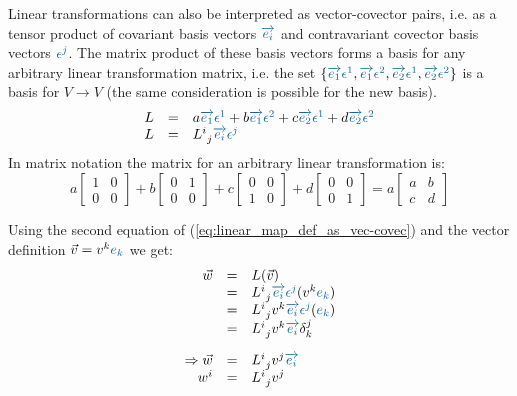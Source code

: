 Linear transformations can also be interpreted as vector-covector pairs, i.e. as a tensor
product of covariant basis vectors $\hdbv{i}$ and contravariant covector basis vectors
$\hdcbvc{j}$. The matrix product of these basis vectors forms a basis for any arbitrary
linear transformation matrix, i.e. the set
$\{\hdbv{1}\hdcbvc{1},\hdbv{1}\hdcbvc{2},\hdbv{2}\hdcbvc{1},\hdbv{2}\hdcbvc{2}\}$ is a
basis for $V \rightarrow V$ (the same consideration is possible for the new basis).
\begin{equation}
    \begin{array}{rcl}
        \label{eq:linear_map_def_as_vec-covec} 
        L & = & a\hdbv{1}\hdcbvc{1}+
                b\hdbv{1}\hdcbvc{2}+
                c\hdbv{2}\hdcbvc{1}+
                d\hdbv{2}\hdcbvc{2} \\
        L & = & L^{i~}_{~j} \hdbv{i}\hdcbvc{j}
    \end{array}
\end{equation}
In matrix notation the matrix for an arbitrary linear transformation is:
\begin{equation}
    a\begin{bmatrix} 1 & 0 \\ 0 & 0 \end{bmatrix} + 
    b\begin{bmatrix} 0 & 1 \\ 0 & 0 \end{bmatrix} + 
    c\begin{bmatrix} 0 & 0 \\ 1 & 0 \end{bmatrix} + 
    d\begin{bmatrix} 0 & 0 \\ 0 & 1 \end{bmatrix} =
    a\begin{bmatrix} a & b \\ c & d \end{bmatrix}
\end{equation}

Using the second equation of (\ref{eq:linear_map_def_as_vec-covec}) and the vector
definition $\vec{v} = \hdvc{k} \hdbvc{k}$ we get:
\begin{equation}
    \begin{array}{rcl}
        \vec{w} & = & L(\vec{v}) \\
          & =  & L^{i~}_{~j} \hdbv{i}\hdcbvc{j} (\hdvc{k} \hdbvc{k}) \\
          & = & L^{i~}_{~j} \hdvc{k}\hdbv{i}\hdcbvc{j}(\hdbvc{k}) \\
          & = & L^{i~}_{~j} \hdvc{k}\hdbv{i} \delta^j_k \\
          \noalign{\vskip10pt}
        \Rightarrow \vec{w} & = & L^{i~}_{~j} \hdvc{j}\hdbv{i} \\
        w^i & = & L^{i~}_{~j} \hdvc{j}
    \end{array}
\end{equation}

\newpage
